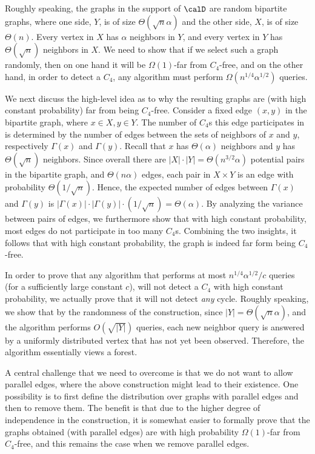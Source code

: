 Roughly speaking, the graphs in the support of $\calD$ are random bipartite graphs, where one side, $Y$, is of size $\Theta(\sqrt{n}\alpha)$ and the other side, $X$, is of size $\Theta(n)$. Every vertex in $X$ has $\alpha$ neighbors in $Y$, and every vertex in $Y$ has $\Theta(\sqrt{n})$ neighbors in $X$. We need to show that if we select such a graph randomly, then on one hand it will be $\Omega(1)$-far from $C_4$-free, and on the other hand, in order to detect a $C_4$, any algorithm must perform $\Omega(n^{1/4}\alpha^{1/2})$ queries.


We next discuss the high-level idea as to why the resulting graphs are (with high constant probability) far from being $C_4$-free. Consider a fixed edge $(x,y)$ in the bipartite graph, where $x\in X, y\in Y$. The number of $C_4$s this edge participates in is determined by the number of edges between the sets of neighbors of $x$ and $y$, respectively $\Gamma(x)$ and $\Gamma(y)$. Recall that $x$ has $\Theta(\alpha)$ neighbors and $y$ has $\Theta(\sqrt n)$ neighbors. Since overall there are $|X|\cdot |Y|=\Theta(n^{3/2}\alpha)$ potential pairs in the bipartite graph, and $\Theta(n\alpha)$ edges, each pair in $X \times Y$ is an edge with probability $\Theta(1/\sqrt n)$. Hence, the expected number of edges between $\Gamma(x)$ and $\Gamma(y)$ is $|\Gamma(x)| \cdot |\Gamma(y)| \cdot (1/\sqrt n)=\Theta(\alpha)$. By analyzing the variance between pairs of edges, we  furthermore show that with high constant probability, most edges do not participate  in too many $C_4$s. Combining the two insights, it follows that with high constant probability, the graph is indeed far form being $C_4$-free.

 
In order to prove that any algorithm that performs at most  $n^{1/4}\alpha^{1/2}/c$   queries (for a sufficiently large constant $c$), will not detect a $C_4$ with high constant probability, we actually prove that it will not detect \emph{any} cycle.  Roughly speaking, we show that by the randomness of the construction, 
since $|Y|=\Theta(\sqrt n \alpha)$, and the algorithm performs $O(\sqrt{|Y|})$ queries,
each new neighbor query is answered by a uniformly   distributed vertex that has not yet been observed. Therefore, the algorithm essentially views a forest. 



A central challenge that we need to overcome is that we do not want to allow parallel edges, where the above construction might lead to their existence. One possibility is to first define the distribution over graphs with parallel edges and then to remove them. The benefit is that due to the higher degree of independence in the construction, it is somewhat easier to formally prove that the graphs obtained (with parallel edges) are with high probability $\Omega(1)$-far from $C_4$-free, and this remains the case when we remove parallel edges.

